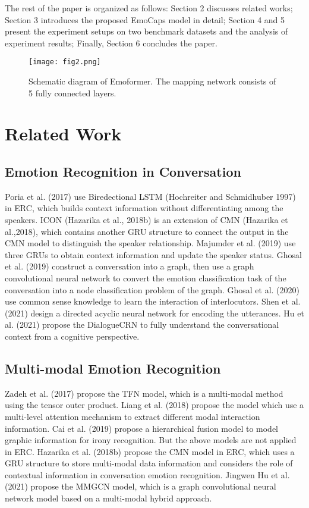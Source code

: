 \documentclass[11pt]{article}
\begin{document}
The rest of the paper is organized as follows: Section 2 discusses related works; Section 3 introduces the proposed EmoCaps model in detail; Section 4 and 5 present the experiment setups on two benchmark datasets and the analysis of experiment results; Finally, Section 6 concludes the paper.
\begin{figure}[t]
	\centering
	\texttt{[image: fig2.png]} \caption{Schematic diagram of Emoformer. The mapping network consists of 5 fully connected layers.}
	\label{fig2}
\end{figure}
\section{Related Work}
\subsection{Emotion Recognition in Conversation}
Poria et al. (2017) use Biredectional LSTM (Hochreiter and Schmidhuber 1997) in ERC, which builds context information without differentiating among the speakers. ICON (Hazarika et al., 2018b) is an extension of CMN (Hazarika et al.,2018), which contains another GRU structure to connect the output in the CMN model to distinguish the speaker relationship. Majumder et al. (2019) use three GRUs to obtain context information and update the speaker status. Ghosal et al. (2019) construct a conversation into a graph, then use a graph convolutional neural network to convert the emotion classification task of the conversation into a node classification problem of the graph. Ghosal et al. (2020) use common sense knowledge to learn the interaction of interlocutors. Shen et al. (2021) design a directed acyclic neural network for encoding the utterances. Hu et al. (2021) propose the DialogueCRN to fully understand the conversational context from a cognitive perspective. 
\subsection{Multi-modal Emotion Recognition}
Zadeh et al. (2017) propose the TFN model, which is a multi-modal method using the tensor outer product. Liang et al. (2018) propose the model which use a multi-level attention mechanism to extract different modal interaction information. Cai et al. (2019) propose a hierarchical fusion model to model graphic information for irony recognition. But the above models are not applied in ERC. Hazarika et al. (2018b) propose the CMN model in ERC, which uses a GRU structure to store multi-modal data information and considers the role of contextual information in conversation emotion recognition. Jingwen Hu et al. (2021) propose the MMGCN model, which is a graph convolutional neural network model based on a multi-modal hybrid approach. 
\end{document}
